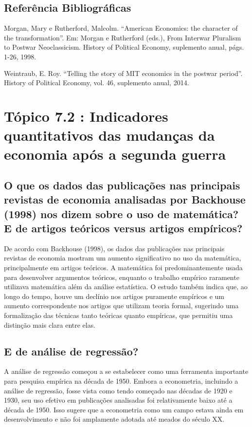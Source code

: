 \documentclass[a4paper,12pt]{article}[abntex2]
\begin{document}
\subsection{\textbf{Referência Bibliográficas}}
Morgan, Mary e Rutherford, Malcolm. “American Economics: the character of the transformation”.
Em: Morgan e Rutherford (eds.), From Interwar Pluralism to Postwar Neoclassicism.
History of Political Economy, suplemento anual, págs. 1-26, 1998.

Weintraub, E. Roy. “Telling the story of MIT economics in the postwar period”. History of
Political Economy, vol. 46, suplemento anual, 2014.

\section{\textbf{Tópico 7.2 : Indicadores quantitativos das mudanças da economia após a segunda guerra}}

\subsection{\textbf{O que os dados das publicações nas principais revistas de economia analisadas por Backhouse (1998) nos dizem sobre o uso de matemática? E de artigos teóricos versus artigos empíricos?}}
 De acordo com Backhouse (1998), os dados das publicações nas principais revistas de economia mostram um aumento significativo no uso da matemática, principalmente em artigos teóricos. A matemática foi predominantemente usada para desenvolver argumentos teóricos, enquanto o trabalho empírico raramente utilizava matemática além da análise estatística. O estudo também indica que, ao longo do tempo, houve um declínio nos artigos puramente empíricos e um aumento correspondente nos artigos que utilizam teoria formal, sugerindo uma formalização das técnicas tanto teóricas quanto empíricas, que permitiu uma distinção mais clara entre elas.

\subsection{\textbf{E de análise de regressão?}}
A análise de regressão começou a se estabelecer como uma ferramenta importante para pesquisa empírica na década de 1950. Embora a econometria, incluindo a análise de regressão, fosse vista como tendo começado nas décadas de 1920 e 1930, seu uso efetivo em publicações analisadas foi relativamente baixo até a década de 1950. Isso sugere que a econometria como um campo estava ainda em desenvolvimento e não foi amplamente adotada até meados do século XX.
\end{document}
